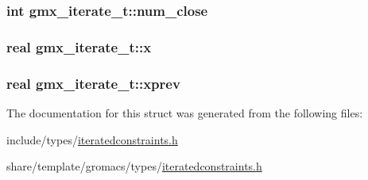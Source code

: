 \hypertarget{structgmx__iterate__t_afa2682bbd3711fc9f0630efb651f5de2}{
\subsubsection[{num\-\_\-close}]{\setlength{\rightskip}{0pt plus 5cm}int {\bf gmx\-\_\-iterate\-\_\-t\-::num\-\_\-close}}}\label{structgmx__iterate__t_afa2682bbd3711fc9f0630efb651f5de2}
\hypertarget{structgmx__iterate__t_af69ba7e581ac4256c9191e09bde041cd}{
\subsubsection[{x}]{\setlength{\rightskip}{0pt plus 5cm}real {\bf gmx\-\_\-iterate\-\_\-t\-::x}}}\label{structgmx__iterate__t_af69ba7e581ac4256c9191e09bde041cd}
\hypertarget{structgmx__iterate__t_a2deb847ae37d581dbe6527d52d2ddc06}{
\subsubsection[{xprev}]{\setlength{\rightskip}{0pt plus 5cm}real {\bf gmx\-\_\-iterate\-\_\-t\-::xprev}}}\label{structgmx__iterate__t_a2deb847ae37d581dbe6527d52d2ddc06}


\-The documentation for this struct was generated from the following files\-:\begin{DoxyCompactItemize}
\item 
include/types/\hyperlink{include_2types_2iteratedconstraints_8h}{iteratedconstraints.\-h}\item 
share/template/gromacs/types/\hyperlink{share_2template_2gromacs_2types_2iteratedconstraints_8h}{iteratedconstraints.\-h}\end{DoxyCompactItemize}
